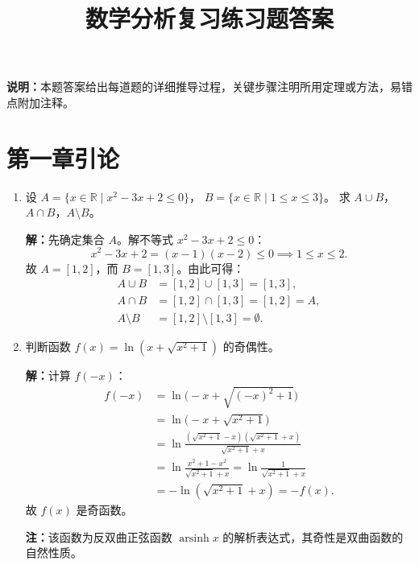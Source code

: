 \documentclass[12pt,a4paper]{ctexart}
\title{数学分析复习练习题答案}
\author{}
\date{}
\begin{document}
\maketitle

\begin{center}
\textbf{说明：}本题答案给出每道题的详细推导过程，关键步骤注明所用定理或方法，易错点附加注释。
\end{center}

\bigskip

\section*{第一章\quad 引论}

\begin{enumerate}[leftmargin=*,label=\arabic*.]
  \item 设 $A = \{x \in \mathbb{R} \mid x^2 - 3x + 2 \le 0\}$，
    $B = \{x \in \mathbb{R} \mid 1 \le x \le 3\}$。
    求 $A \cup B$，$A \cap B$，$A \setminus B$。

    \textbf{解：}先确定集合 $A$。解不等式 $x^2-3x+2 \le 0$：
    \[
    x^2-3x+2 = (x-1)(x-2) \le 0 \implies 1 \le x \le 2.
    \]
    故 $A = [1,2]$，而 $B = [1,3]$。由此可得：
    \begin{align*}
      A \cup B &= [1,2] \cup [1,3] = [1,3], \\
      A \cap B &= [1,2] \cap [1,3] = [1,2] = A, \\
      A \setminus B &= [1,2] \setminus [1,3] = \emptyset.
    \end{align*}

  \item 判断函数 $f(x) = \ln(x + \sqrt{x^2+1})$ 的奇偶性。

    \textbf{解：}计算 $f(-x)$：
    \begin{align*}
      f(-x) &= \ln\bigl(-x + \sqrt{(-x)^2+1}\bigr) \\
            &= \ln\bigl(-x + \sqrt{x^2+1}\bigr) \\
            &= \ln\frac{(\sqrt{x^2+1} - x)(\sqrt{x^2+1} + x)}{\sqrt{x^2+1} + x} \\
            &= \ln\frac{x^2+1 - x^2}{\sqrt{x^2+1} + x}
             = \ln\frac{1}{\sqrt{x^2+1} + x} \\
            &= -\ln(\sqrt{x^2+1} + x) = -f(x).
    \end{align*}
    故 $f(x)$ 是奇函数。

    \textbf{注：}该函数为反双曲正弦函数 $\operatorname{arsinh}x$ 的解析表达式，其奇性是双曲函数的自然性质。


\end{enumerate}
\end{document}
